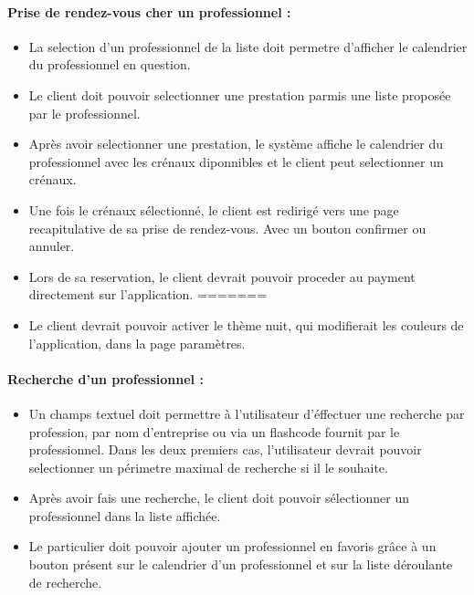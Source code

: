 \documentclass{article}
\begin{document}
\begin{itemize}
\begin{itemize}
\end{itemize}

\paragraph{Prise de rendez-vous cher un professionnel :}
\begin{itemize}

\item La selection d'un
  professionnel de la liste doit permetre d'afficher le
  calendrier du professionnel en question.
\item Le client doit pouvoir selectionner une prestation parmis une liste
  proposée par le professionnel.
\item Après avoir selectionner une prestation, le système affiche le
  calendrier du professionnel avec les crénaux diponnibles et le
  client peut selectionner un crénaux.
\item Une fois le crénaux sélectionné, le client est redirigé vers
    une page recapitulative de sa prise de rendez-vous. Avec un bouton
    confirmer ou annuler.
\item Lors de sa reservation, le client devrait pouvoir proceder au
  payment directement sur l'application.
=======
\item Le client devrait pouvoir activer le thème nuit, qui modifierait les
  couleurs de l'application, dans la page paramètres.
\end{itemize}
\paragraph{Recherche d'un professionnel :}
\begin{itemize}
\item Un champs textuel doit permettre à l'utilisateur d'éffectuer une
  recherche par profession, par nom
  d'entreprise ou via un flashcode fournit par le professionnel. Dans
  les deux premiers cas, l'utilisateur devrait pouvoir selectionner
  un périmetre maximal de recherche si il le souhaite.
\item Après avoir fais une recherche, le client doit pouvoir sélectionner un
  professionnel dans la liste affichée.
\item Le particulier doit pouvoir ajouter un professionnel en favoris grâce
  à un bouton présent sur le calendrier d'un professionnel et sur la
  liste déroulante de recherche.



\end{itemize}
\end{itemize}
\end{document}
